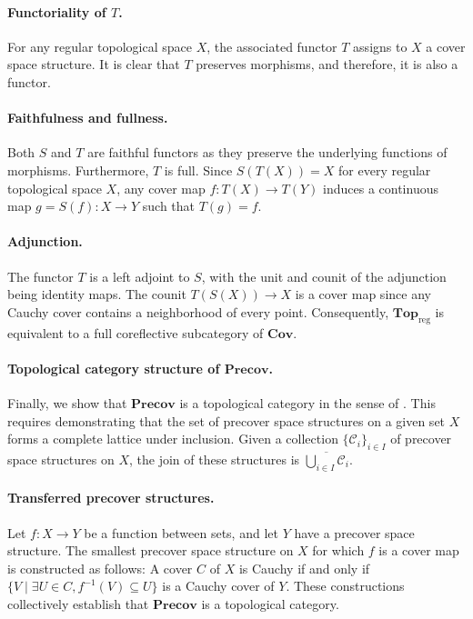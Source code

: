 \documentclass[reqno]{amsart}
\theoremstyle{definition}
\theoremstyle{remark}
\numberwithin{figure}{section}
\newcommand{\cat}[1]{\mathbf{#1}}
\begin{document}
\paragraph{Functoriality of $T$.}
For any regular topological space $X$, the associated functor $T$ assigns to $X$ a cover space structure.
It is clear that $T$ preserves morphisms, and therefore, it is also a functor.

\paragraph{Faithfulness and fullness.}
Both $S$ and $T$ are faithful functors as they preserve the underlying functions of morphisms.
Furthermore, $T$ is full.
Since $S(T(X)) = X$ for every regular topological space $X$, any cover map $f : T(X) \to T(Y)$ induces a continuous map $g = S(f) : X \to Y$ such that $T(g) = f$.

\paragraph{Adjunction.}
The functor $T$ is a left adjoint to $S$, with the unit and counit of the adjunction being identity maps.
The counit $T(S(X)) \to X$ is a cover map since any Cauchy cover contains a neighborhood of every point.
Consequently, $\cat{Top}_\mathrm{reg}$ is equivalent to a full coreflective subcategory of $\cat{Cov}$.

\paragraph{Topological category structure of $\cat{Precov}$.}
Finally, we show that $\cat{Precov}$ is a topological category in the sense of \cite[Definition~21.7]{joy-cats}.
This requires demonstrating that the set of precover space structures on a given set $X$ forms a complete lattice under inclusion.
Given a collection $\{\mathcal{C}_i\}_{i \in I}$ of precover space structures on $X$,
the join of these structures is $\overline{\bigcup_{i \in I} \mathcal{C}_i}$.

\paragraph{Transferred precover structures.}
Let $f : X \to Y$ be a function between sets, and let $Y$ have a precover space structure.
The smallest precover space structure on $X$ for which $f$ is a cover map is constructed as follows:
A cover $C$ of $X$ is Cauchy if and only if $\{ V \mid \exists U \in C, f^{-1}(V) \subseteq U \}$ is a Cauchy cover of $Y$.
These constructions collectively establish that $\cat{Precov}$ is a topological category.
\end{document}
